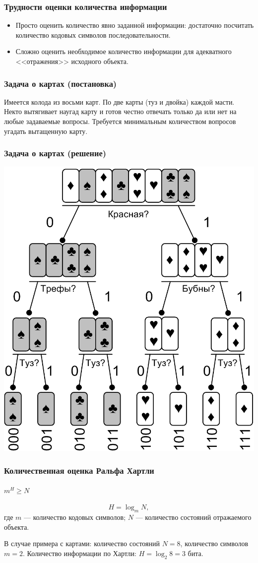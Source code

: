 \begin{frame}
    \frametitle{Трудности оценки количества информации}

    \begin{itemize}
        \item Просто оценить количество явно заданной информации: достаточно посчитать количество кодовых символов последовательности. 
    
        \item Сложно оценить необходимое количество информации для адекватного <<отражения>> исходного объекта.
    \end{itemize}
\end{frame}

\begin{frame}
    \frametitle{Задача о картах (постановка)}
    
    \begin{example}
        Имеется колода из восьми карт. По две карты (туз и двойка) каждой масти. Некто вытягивает наугад карту и готов честно отвечать только да или нет на любые задаваемые вопросы. Требуется минимальным количеством вопросов угадать вытащенную карту.
    \end{example} 
\end{frame}

\begin{frame}
    \frametitle{Задача о картах (решение)}
    
    \begin{center}
        \includegraphics[width=.45\textwidth]{fig/cards} 
    \end{center} 
\end{frame}

\begin{frame}
    \frametitle{Количественная оценка Ральфа Хартли}
    \framesubtitle{$m^H\geq N$}
    
    \[
        H=\log_{m}N,
    \]
    где $m$ --- количество \alert{кодовых символов}; $N$ --- количество состояний \alert{отражаемого объекта}.

    \begin{example}
        В случае примера с картами: количество состояний $N=8$, количество символов $m=2$. Количество информации по Хартли: $H=\log_{2}8=3$ бита.
    \end{example}
\end{frame}

